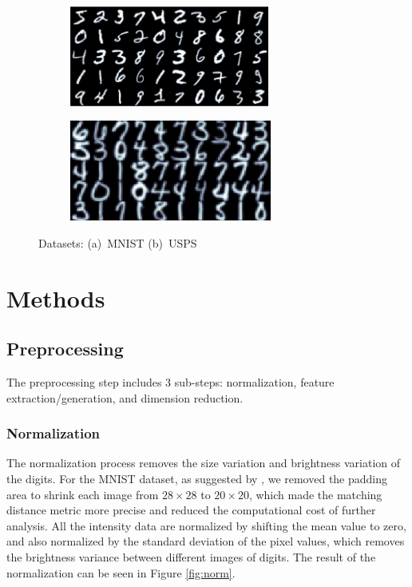 \documentclass[12pt]{article}
\begin{document}
\begin{figure}[tbp]
	\centering
	\begin{subfigure}{.45\textwidth}
		\includegraphics[height = 1.3in]{MNIST}		
		\caption{ }
	\end{subfigure}
	\begin{subfigure}{.45\textwidth}
		\includegraphics[height = 1.3in]{USPS}		
		\caption{ }
	\end{subfigure}
	\caption{Datasets: (a)~MNIST (b)~USPS}
\end{figure}

\section{Methods}
\label{sec:methods}

\subsection{Preprocessing}

The preprocessing step includes 3 sub-steps: normalization, feature extraction/generation, and dimension reduction. 

\subsubsection{Normalization}
The normalization process removes the size variation and brightness variation of the digits. For the MNIST dataset, as suggested by \cite{lecun1998gradient}, we removed the padding area to shrink each image from $28 \times 28$ to $20 \times 20$, which made the matching distance metric more precise and reduced the computational cost of further analysis. All the intensity data are normalized by shifting the mean value to zero, and also normalized by the standard deviation of the pixel values, which removes the brightness variance between different images of digits. The result of the normalization can be seen in Figure \ref{fig:norm}.
\end{document}
